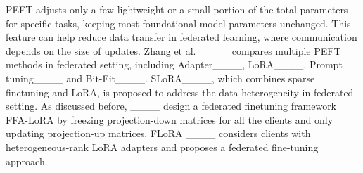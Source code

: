 PEFT adjusts only a few lightweight or a small portion of the total parameters for specific tasks, keeping most foundational model parameters unchanged. This feature can help reduce data transfer in federated learning, where communication depends on the size of updates. Zhang et al. ____ compares multiple PEFT methods in federated setting, including Adapter____, LoRA____, Prompt tuning____ and Bit-Fit____. SLoRA____, which combines sparse finetuning and LoRA, is proposed to address the data heterogeneity in federated setting. 
As discussed before, ____ design a federated finetuning framework FFA-LoRA by freezing projection-down matrices for all the clients and only updating projection-up matrices. %
FLoRA ____ considers clients with heterogeneous-rank LoRA adapters and proposes a federated fine-tuning approach.